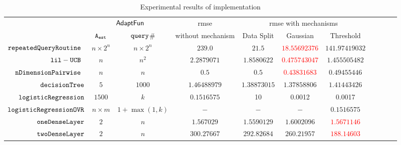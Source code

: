 {\footnotesize
\begin {table}[H]
\vspace{-0.4cm}
    \caption{Experimental results of {\THESYSTEM} implementation}
    \vspace{-0.5cm}
        \label{tb:adapt-imp}
        \begin{center}
        \centering
{\tiny
        \begin{tabular}{| >{\tiny}r | c | c | c | c | c | c | c | c | c | c  }
         \hline \hline
        \multirow{2}{*}{Program $c$}
         & \multicolumn{2}{c|}{$\textsf{AdaptFun}$}
         & {rmse}
         & \multicolumn{3}{c|}{rmse with mechanisms} \\ 
         \cline{2-3} \cline{5-7}
         & {${\mathtt{A_{est}}}$ } & {${\tt query}$\# } &  without mechanism & Data Split & Gaussian & Threshold  \\ 
         \cline{6-7}
         \hline \hline
         $  \mathtt{repeatedQueryRoutine}$~\cite{Jamieson2015TheAO} & $ n \times 2^n $ & $  n \times 2^n $ & $239.0$   & $21.5$ & \textcolor{red}{$18.55692376$} & $141.97419032$  \\
         $  \mathtt{lil-UCB}$~\cite{Jamieson2015TheAO} & $ n $ & $  n^2 $ & $ 2.2879071$   & $ 1.8580622$ & \textcolor{red}{$0.475743047$} & $ 1.455505482 $  \\
         $  \mathtt{nDimensionPairwise}$~\cite{Jamieson2015TheAO} & $ n $ & $  n  $ & $0.5$   & $0.5$ & \textcolor{red}{$ 0.43831683 $} & $ 0.49455446 $  \\
         $  \mathtt{decisionTree}$ & $5$ &  $1000$ & $1.46488979$  & $ 1.38873015 $ & $ 1.37858806 $ &$ 1.41443426 $  \\
         $  \mathtt{logisticRegression}$ & $1500$ &  $k$ & $ 0.1516575 $  &  10 & 0.0012 & 0.0017   \\
         $  \mathtt{logisticRegressionOVR}$    & $n\times m$ &  $1+ \max(1, k) $ &  $ -  $  &  $-$ & $-$ & $ 0.1516575 $ \\
         $  \mathtt{oneDenseLayer}$ & $2$   & $ n $   &  $ 1.567029  $  &  {$ 1.5590129 $} & $1.6002096$ & \textcolor{red}{$ 1.5671146 $}  \\
         {$ \mathtt{twoDenseLayer}$} & $2$ &  $ n $ &  $ 300.27667 $  &  $ 292.82684 $ & $ 260.21957 $ & \textcolor{red}{$ 188.14603 $}  \\

\end{tabular}}
\end{center}
\end{table}}
